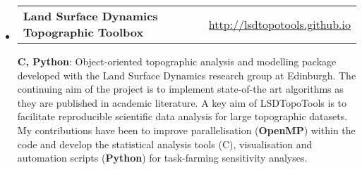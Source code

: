 \documentclass[10.5pt,a4]{article}
\makeatletter
\newcommand{\headerrow}[2]
{\begin{tabular*}{\linewidth}{l@{\extracolsep{\fill}}r}
	#1 &
	#2 \\
\end{tabular*}}
\newcommand{\CPP}
{C\nolinebreak[4]\hspace{-.05em}\raisebox{.22ex}{\footnotesize\bf ++}}
\makeatother
\begin{document}
\begin{itemize}
	\item
	\headerrow
		{\textbf{Land Surface Dynamics Topographic Toolbox}}
		{\url{http://lsdtopotools.github.io}}

		\textbf{{\CPP}, Python}: Object-oriented topographic analysis and modelling package developed with the Land Surface Dynamics research group at Edinburgh. The continuing aim of the project is to implement state-of-the art algorithms as they are published in academic literature. A key aim of LSDTopoTools is to facilitate reproducible scientific data analysis for large topographic datasets. \\
		My contributions have been to improve parallelisation (\textbf{OpenMP}) within the code and develop the statistical analysis tools (\CPP), visualisation and automation scripts (\textbf{Python}) for task-farming sensitivity analyses.
	
%

\end{itemize}
\end{document}
